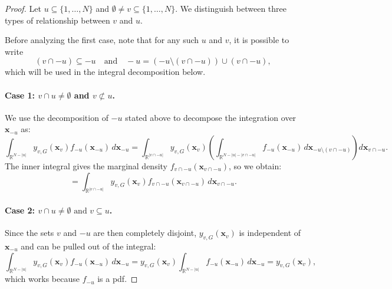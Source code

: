 \begin{proof}
Let $u \subseteq \{1,\dots,N\}$ and $\emptyset \ne v \subseteq \{1,\dots,N\}$. We distinguish between three types of relationship between $v$ and $u$.

Before analyzing the first case, note that for any such $u$ and $v$, it is possible to write
\[
(v \cap -u) \subseteq -u \quad \text{and} \quad -u = (-u \setminus (v \cap -u)) \cup (v \cap -u),
\]
which will be used in the integral decomposition below.

\paragraph{Case 1: \( v \cap u \ne \emptyset \) and \( v \not\subset u \).}
We use the decomposition of $-u$ stated above to decompose the integration over $\mathbf{x}_{-u}$ as:
\[
\int_{\mathbb{R}^{N - |u|}} y_{v,G}(\mathbf{x}_v) f_{-u}(\mathbf{x}_{-u}) \, d\mathbf{x}_{-u}
= \int_{\mathbb{R}^{|v \cap -u|}} y_{v,G}(\mathbf{x}_v)
\left( \int_{\mathbb{R}^{N - |u| - |v \cap -u|}} f_{-u}(\mathbf{x}_{-u}) \, d\mathbf{x}_{-u \setminus (v \cap -u)} \right)
d\mathbf{x}_{v \cap -u}.
\]
The inner integral gives the marginal density $f_{v \cap -u}(\mathbf{x}_{v \cap -u})$, so we obtain:
\[
= \int_{\mathbb{R}^{|v \cap -u|}} y_{v,G}(\mathbf{x}_v) f_{v \cap -u}(\mathbf{x}_{v \cap -u}) \, d\mathbf{x}_{v \cap -u}.
\]

\paragraph{Case 2: $v \cap u \ne \emptyset \text{ and } v \subseteq u$.}
Since the sets $v$ and $-u$ are then completely disjoint, $y_{v,G}(\mathbf{x}_v)$ is independent of $\mathbf{x}_{-u}$ and can be pulled out of the integral:
\[
\int_{\mathbb{R}^{N - |u|}} y_{v,G}(\mathbf{x}_v) f_{-u}(\mathbf{x}_{-u}) \, d\mathbf{x}_{-u}
= y_{v,G}(\mathbf{x}_v) \int_{\mathbb{R}^{N - |u|}} f_{-u}(\mathbf{x}_{-u}) \, d\mathbf{x}_{-u}
= y_{v,G}(\mathbf{x}_v),
\]
which works because $f_{-u}$ is a pdf.


\end{proof}
